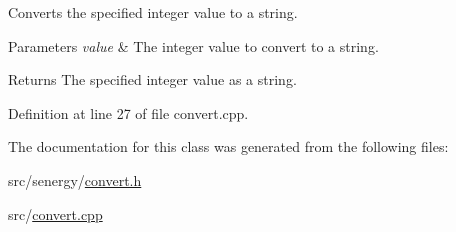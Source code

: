 Converts the specified integer value to a string. 


\begin{DoxyParams}{Parameters}
{\em value} & The integer value to convert to a string.\\
\hline
\end{DoxyParams}
\begin{DoxyReturn}{Returns}
The specified integer value as a string. 
\end{DoxyReturn}


Definition at line 27 of file convert.\-cpp.



The documentation for this class was generated from the following files\-:\begin{DoxyCompactItemize}
\item 
src/senergy/\hyperlink{convert_8h}{convert.\-h}\item 
src/\hyperlink{convert_8cpp}{convert.\-cpp}\end{DoxyCompactItemize}
